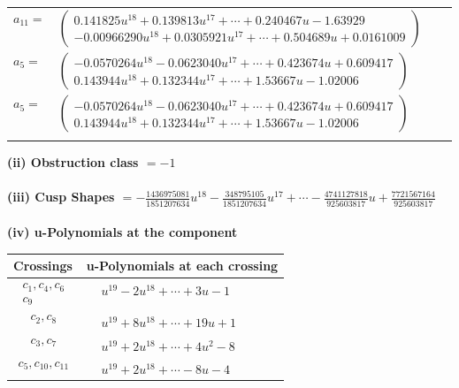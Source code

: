 \documentclass[1p]{elsarticle_modified}
\theoremstyle{definition}
\begin{document}
\begin{tabular}{m{7pt} m{180pt} m{7pt} m{180pt} }
\flushright $a_{11}=$&$\begin{pmatrix}0.141825 u^{18}+0.139813 u^{17}+\cdots+0.240467 u-1.63929\\-0.00966290 u^{18}+0.0305921 u^{17}+\cdots+0.504689 u+0.0161009\end{pmatrix}$ \\
\flushright $a_{5}=$&$\begin{pmatrix}-0.0570264 u^{18}-0.0623040 u^{17}+\cdots+0.423674 u+0.609417\\0.143944 u^{18}+0.132344 u^{17}+\cdots+1.53667 u-1.02006\end{pmatrix}$\\ \flushright $a_{5}=$&$\begin{pmatrix}-0.0570264 u^{18}-0.0623040 u^{17}+\cdots+0.423674 u+0.609417\\0.143944 u^{18}+0.132344 u^{17}+\cdots+1.53667 u-1.02006\end{pmatrix}$\\&\end{tabular}
\flushleft \textbf{(ii) Obstruction class $= -1$}\\~\\
\flushleft \textbf{(iii) Cusp Shapes $= -\frac{1436975081}{1851207634} u^{18}-\frac{348795105}{1851207634} u^{17}+\cdots-\frac{4741127818}{925603817} u+\frac{7721567164}{925603817}$}\\~\\
\newpage\renewcommand{\arraystretch}{1}
\flushleft \textbf{(iv) u-Polynomials at the component}\newline \\
\begin{tabular}{m{50pt}|m{274pt}}
Crossings & \hspace{64pt}u-Polynomials at each crossing \\
\hline $$\begin{aligned}c_{1},c_{4},c_{6}\\c_{9}\end{aligned}$$&$\begin{aligned}
&u^{19}-2 u^{18}+\cdots+3 u-1
\end{aligned}$\\
\hline $$\begin{aligned}c_{2},c_{8}\end{aligned}$$&$\begin{aligned}
&u^{19}+8 u^{18}+\cdots+19 u+1
\end{aligned}$\\
\hline $$\begin{aligned}c_{3},c_{7}\end{aligned}$$&$\begin{aligned}
&u^{19}+2 u^{18}+\cdots+4 u^2-8
\end{aligned}$\\
\hline $$\begin{aligned}c_{5},c_{10},c_{11}\end{aligned}$$&$\begin{aligned}
&u^{19}+2 u^{18}+\cdots-8 u-4
\end{aligned}$\\
\hline
\end{tabular}\\~\\
\end{document}
